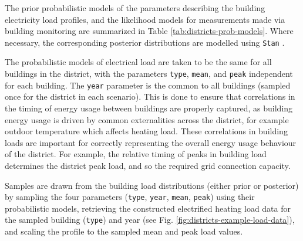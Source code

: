 The prior probabilistic models of the parameters describing the building electricity load profiles, and the likelihood models for measurements made via building monitoring are summarized in Table \ref{tab:districts-prob-models}. Where necessary, the corresponding posterior distributions are modelled using \texttt{Stan} \citep{carpenter2017StanProbabilisticProgramming}.

The probabilistic models of electrical load are taken to be the same for all buildings in the district, with the parameters \texttt{type}, \texttt{mean}, and \texttt{peak} independent for each building. The \texttt{year} parameter is the common to all buildings (sampled once for the district in each scenario). This is done to ensure that correlations in the timing of energy usage between buildings are properly captured, as building energy usage is driven by common externalities across the district, for example outdoor temperature which affects heating load. These correlations in building loads are important for correctly representing the overall energy usage behaviour of the district. For example, the relative timing of peaks in building load determines the district peak load, and so the required grid connection capacity.

Samples are drawn from the building load distributions (either prior or posterior) by sampling the four parameters (\texttt{type}, \texttt{year}, \texttt{mean}, \texttt{peak}) using their probabilistic models, retrieving the constructed electrified heating load data for the sampled building (\texttt{type}) and year (see Fig. \ref{fig:districts-example-load-data}), and scaling the profile to the sampled mean and peak load values.

\vfill

